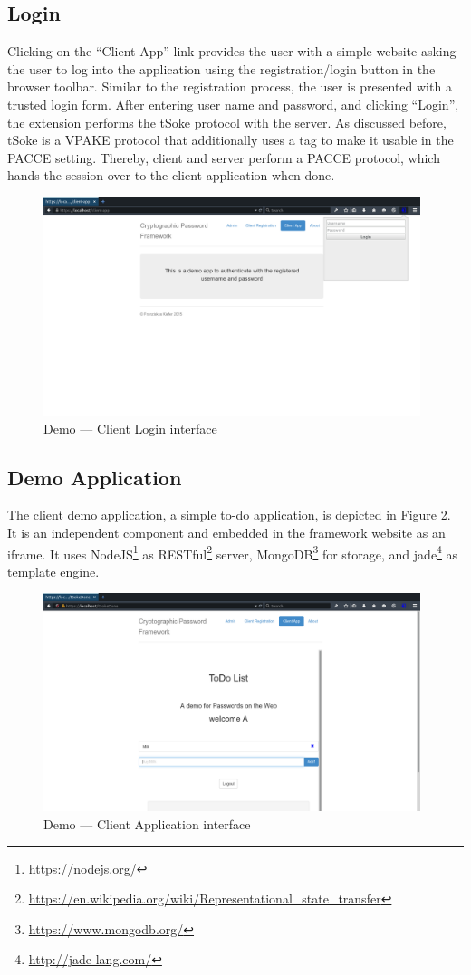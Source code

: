 \subsection{Login}
Clicking on the ``Client App'' link provides the user with a simple website asking the user to log into the application using the registration/login button in the browser toolbar.
Similar to the registration process, the user is presented with a trusted login form.
After entering user name and password, and clicking ``Login'', the extension performs the tSoke protocol with the server.
As discussed before, tSoke is a \ac{VPAKE} protocol that additionally uses a tag to make it usable in the \ac{PACCE} setting.
Thereby, client and server perform a \ac{PACCE} protocol, which hands the session over to the client application when done.

\begin{figure}[tbph]
\centering
\includegraphics[width=0.98\textwidth]{Figs/demo-login-popup.png}
\caption{Demo --- Client Login interface}\label{fig:demo-login}
\end{figure}

\subsection{Demo Application}
The client demo application, a simple to-do application, is depicted in Figure \ref{fig:demo-app}.
It is an independent component and embedded in the framework website as an iframe.
It uses NodeJS\footnote{\url{https://nodejs.org/}} as RESTful\footnote{\url{https://en.wikipedia.org/wiki/Representational_state_transfer}} server, MongoDB\footnote{\url{https://www.mongodb.org/}} for storage, and jade\footnote{\url{http://jade-lang.com/}} as template engine.

\begin{figure}[tbph]
\centering
\includegraphics[width=0.98\textwidth]{Figs/demo-app.png}
\caption{Demo --- Client Application interface}\label{fig:demo-app}
\end{figure}
